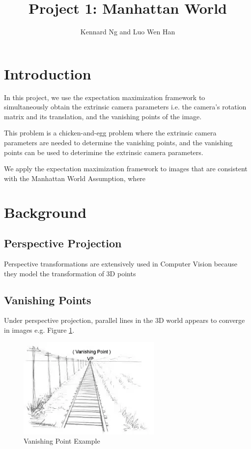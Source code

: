 \documentclass[a4paper]{article}
\author{Kennard Ng and Luo Wen Han}
\title{Project 1: Manhattan World}
\begin{document}
	\maketitle
	\section{Introduction}
	
	In this project, we use the expectation maximization framework to simultaneously obtain the extrinsic camera parameters i.e. the camera's rotation matrix and its translation, and the vanishing points of the image. 
	
	This problem is a chicken-and-egg problem where the extrinsic camera parameters are needed to determine the vanishing points, and the vanishing points can be used to deterimine the extrinsic camera parameters. 
	
	We apply the expectation maximization framework to images that are consistent with the Manhattan World Assumption, where 
	
	\section{Background}
	
	\subsection{Perspective Projection}
	
	Perspective transformations are extensively used in Computer Vision because they model the transformation of 3D points 
	
	\subsection{Vanishing Points}
	
	Under perspective projection, parallel lines in the 3D world appears to converge in images e.g. Figure \ref{fig:vp_eg}.
	
	\begin{figure}[ht]
		\centering
		\includegraphics[width=0.5\linewidth]{images/vp_eg}
		\caption{Vanishing Point Example}
		\label{fig:vp_eg}
	\end{figure}
\end{document}
